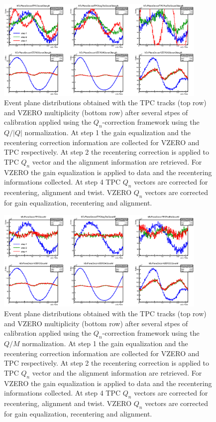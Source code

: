 \begin{figure}
\centering
 \includegraphics[width=0.9\textwidth]{FigCap5/EP_overQlengthnorm.eps}
 \caption{Event plane distributions obtained with the TPC tracks (top
   row) and VZERO multiplicity (bottom row) after several stpes of
   calibration applied using the $Q_n$-correction framework using the
   $Q/|Q|$ normalization. At step 1 the gain equalization and the
   recentering correction
   information are collected for VZERO and TPC respectively. At
   step 2 the recentering correction is applied to TPC $Q_n$ vector
   and the alignment information are retrieved. For VZERO the gain
   equalization is applied to data and the recentering informations
   collected. At step 4 TPC $Q_n$ vectors are corrected for
   recentering, alignment and twist. VZERO $Q_n$ vectors are corrected
   for gain equalization, recentering
   and alignment.}
   \label{fig:QoverQlengthCalibration}
\end{figure}

\begin{figure}
\centering
 \includegraphics[width=0.9\textwidth]{FigCap5/EP_overMnorm.eps}
 \caption{Event plane distributions obtained with the TPC tracks (top row) and VZERO multiplicity (bottom row) after several stpes of calibration applied using the $Q_n$-correction framework using the $Q/M$ normalization. At step 1 the gain equalization and the
   recentering correction
   information are collected for VZERO and TPC respectively. At
   step 2 the recentering correction is applied to TPC $Q_n$ vector
   and the alignment information are retrieved. For VZERO the gain
   equalization is applied to data and the recentering informations
   collected. At step 4 TPC $Q_n$ vectors are corrected for
   recentering, alignment and twist. VZERO $Q_n$ vectors are corrected
   for gain equalization, recentering
   and alignment.}
   \label{fig:QoverMCalibration}
\end{figure}
